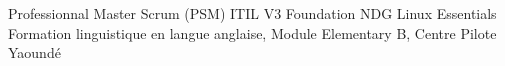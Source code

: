 %
%
%


\begin{scholarship}
					{Professionnal Master Scrum (PSM)}
					{ITIL V3 Foundation}
					{NDG Linux Essentials}
					{Formation linguistique en langue anglaise, Module Elementary B, Centre Pilote Yaoundé}
	
\end{scholarship}